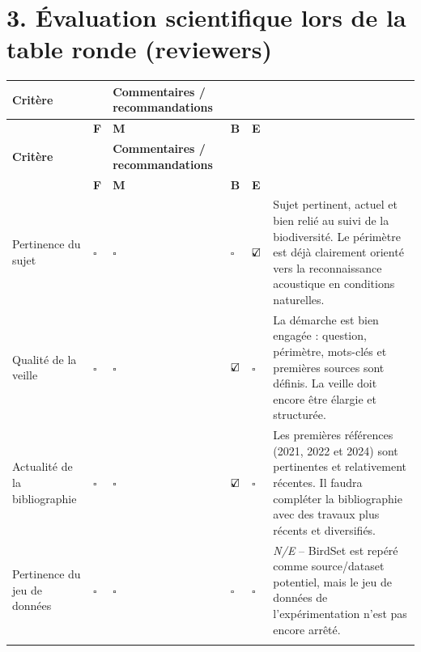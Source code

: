\documentclass[11pt,a4paper]{article}
\newcommand{\checkbox}{\ensuremath{\square}}
\newcommand{\checkedbox}{\ensuremath{\rlap{\checkmark}\square}}
\newcommand{\neval}{\textit{N/E}}
\begin{document}
\section*{3. Évaluation scientifique lors de la table ronde (reviewers)}

\small
\setlength{\tabcolsep}{2.2pt}
\begin{longtable}{@{}>{\raggedright\arraybackslash}p{3.0cm}
                        >{\centering\arraybackslash}p{0.70cm}
                        >{\centering\arraybackslash}p{0.70cm}
                        >{\centering\arraybackslash}p{0.70cm}
                        >{\centering\arraybackslash}p{0.70cm}
                        >{\raggedright\arraybackslash}p{9.6cm}@{}}
\toprule
\textbf{Critère} & \multicolumn{4}{c}{\textbf{Évaluation}} & \textbf{Commentaires / recommandations} \\
\cmidrule(lr){2-5}
& \textbf{F} & \textbf{M} & \textbf{B} & \textbf{E} & \\
\midrule
\endfirsthead
\toprule
\textbf{Critère} & \multicolumn{4}{c}{\textbf{Évaluation}} & \textbf{Commentaires / recommandations} \\
\cmidrule(lr){2-5}
& \textbf{F} & \textbf{M} & \textbf{B} & \textbf{E} & \\
\midrule
\endhead

Pertinence du sujet
& \checkbox & \checkbox & \checkbox & \checkedbox
& Sujet pertinent, actuel et bien relié au suivi de la biodiversité. Le périmètre est déjà clairement orienté vers la reconnaissance acoustique en conditions naturelles. \\
\addlinespace[0.35em]

Qualité de la veille
& \checkbox & \checkbox & \checkedbox & \checkbox
& La démarche est bien engagée : question, périmètre, mots-clés et premières sources sont définis. La veille doit encore être élargie et structurée. \\
\addlinespace[0.35em]

Actualité de la bibliographie
& \checkbox & \checkbox & \checkedbox & \checkbox
& Les premières références (2021, 2022 et 2024) sont pertinentes et relativement récentes. Il faudra compléter la bibliographie avec des travaux plus récents et diversifiés. \\
\addlinespace[0.35em]

Pertinence du jeu de données
& \checkbox & \checkbox & \checkbox & \checkbox
& \neval{} -- BirdSet est repéré comme source/dataset potentiel, mais le jeu de données de l'expérimentation n'est pas encore arrêté. \\
\addlinespace[0.35em]


\end{longtable}
\end{document}
